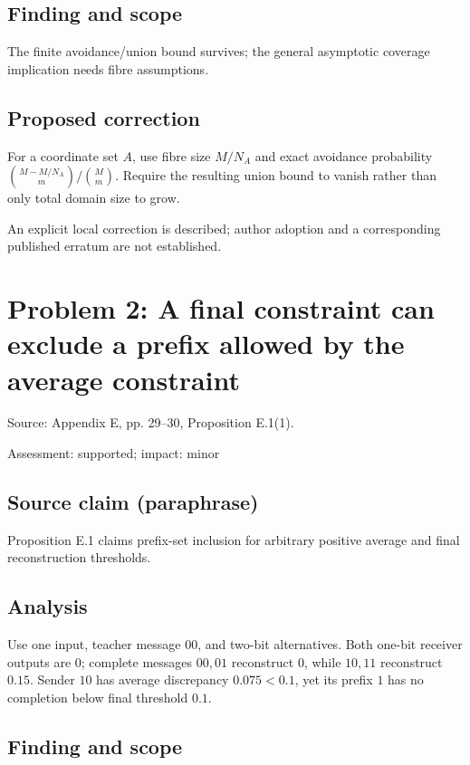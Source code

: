 \documentclass[11pt]{article}
\begin{document}
\subsection*{Finding and scope}

The finite avoidance/union bound survives; the general asymptotic coverage implication needs fibre assumptions.

\subsection*{Proposed correction}

For a coordinate set \(A\), use fibre size \(M/N_A\) and exact avoidance probability \(\binom{M-M/N_A}{m}/\binom{M}{m}\). Require the resulting union bound to vanish rather than only total domain size to grow.

An explicit local correction is described; author adoption and a corresponding published erratum are not established.

\section*{Problem 2: A final constraint can exclude a prefix allowed by the average constraint}

Source: Appendix E, pp. 29–30, Proposition E.1(1).

Assessment: supported; impact: minor

\subsection*{Source claim (paraphrase)}

Proposition E.1 claims prefix-set inclusion for arbitrary positive average and final reconstruction thresholds.

\subsection*{Analysis}

Use one input, teacher message \(00\), and two-bit alternatives. Both one-bit receiver outputs are \(0\); complete messages \(00,01\) reconstruct \(0\), while \(10,11\) reconstruct \(0.15\). Sender \(10\) has average discrepancy \(0.075<0.1\), yet its prefix \(1\) has no completion below final threshold \(0.1\).

\subsection*{Finding and scope}
\end{document}
